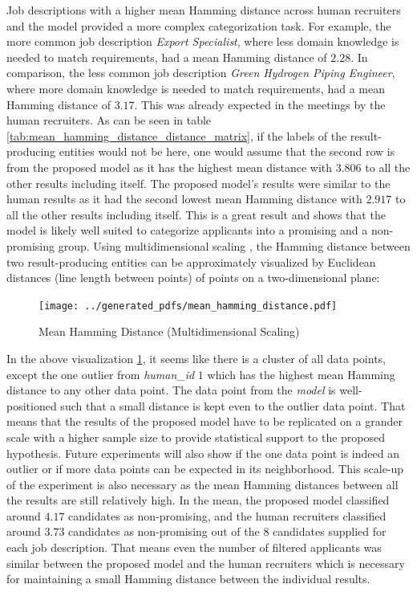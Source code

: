 \documentclass[draft,final]{thesisclass} %
\begin{document}
Job descriptions with a higher mean Hamming distance across human recruiters and the model provided a more complex categorization task. For example, the more common job description \textit{Export Specialist}, where less domain knowledge is needed to match requirements, had a mean Hamming distance of $2.28$. In comparison, the less common job description \textit{Green Hydrogen Piping Engineer}, where more domain knowledge is needed to match requirements, had a mean Hamming distance of $3.17$. This was already expected in the meetings by the human recruiters. As can be seen in table \ref{tab:mean_hamming_distance_distance_matrix}, if the labels of the result-producing entities would not be here, one would assume that the second row is from the proposed model as it has the highest mean distance with $3.806$ to all the other results including itself. The proposed model's results were similar to the human results as it had the second lowest mean Hamming distance with $2.917$ to all the other results including itself. This is a great result and shows that the model is likely well suited to categorize applicants into a promising and a non-promising group. Using multidimensional scaling \parencite{mds}, the Hamming distance between two result-producing entities can be approximately visualized by Euclidean distances (line length between points) of points on a two-dimensional plane:
\begin{figure}[H]
    \centering
    \texttt{[image: ../generated\_pdfs/mean\_hamming\_distance.pdf]}
    \caption{Mean Hamming Distance (Multidimensional Scaling) \parencite{mds}}
    \label{fig:mean_hamming_distance_mds}
\end{figure}
In the above visualization \ref{fig:mean_hamming_distance_mds}, it seems like there is a cluster of all data points, except the one outlier from \textit{human\_id} $1$ which has the highest mean Hamming distance to any other data point. The data point from the \textit{model} is well-positioned such that a small distance is kept even to the outlier data point. That means that the results of the proposed model have to be replicated on a grander scale with a higher sample size to provide statistical support to the proposed hypothesis. Future experiments will also show if the one data point is indeed an outlier or if more data points can be expected in its neighborhood. This scale-up of the experiment is also necessary as the mean Hamming distances between all the results are still relatively high. In the mean, the proposed model classified around $4.17$ candidates as non-promising, and the human recruiters classified around $3.73$ candidates as non-promising out of the $8$ candidates supplied for each job description. That means even the number of filtered applicants was similar between the proposed model and the human recruiters which is necessary for maintaining a small Hamming distance between the individual results.
\end{document}
